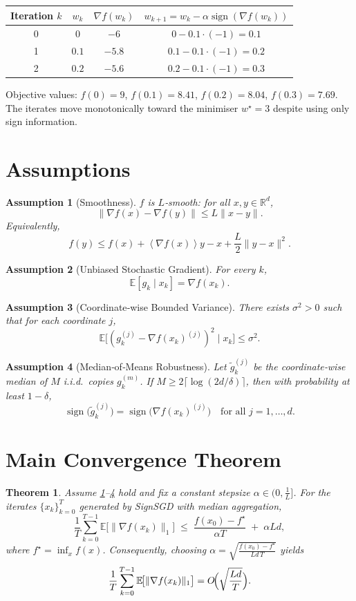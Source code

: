 \documentclass{article}
\newtheorem{theorem}{Theorem}
\newtheorem{assumption}{Assumption}
\newcommand{\E}{\mathbb{E}}
\newcommand{\R}{\mathbb{R}}
\newcommand{\sign}{\operatorname{sign}}
\newcommand{\inner}[1]{\left\langle#1\right\rangle}
\begin{document}
\begin{center}
\begin{tabular}{c|c|c|c}
Iteration $k$ & $w_k$ & $\nabla f(w_k)$ & $w_{k+1}=w_k-\alpha\sign(\nabla f(w_k))$\\ \hline
0 & $0$ & $-6$ & $0-0.1\cdot(-1)=0.1$\\
1 & $0.1$ & $-5.8$ & $0.1-0.1\cdot(-1)=0.2$\\
2 & $0.2$ & $-5.6$ & $0.2-0.1\cdot(-1)=0.3$\\
\end{tabular}
\end{center}
Objective values: $f(0)=9$, $f(0.1)=8.41$, $f(0.2)=8.04$, $f(0.3)=7.69$.  The iterates move monotonically toward the minimiser $w^\star=3$ despite using only sign information.

\newpage
\section*{Assumptions}
\begin{assumption}[Smoothness]\label{ass:smooth}
$f$ is $L$‑smooth: for all $x,y\in\R^{d}$,
\[
\|\nabla f(x)-\nabla f(y)\|\le L\|x-y\|.
\]
Equivalently,
\[
f(y)\le f(x)+\inner{\nabla f(x)}{y-x}+\frac{L}{2}\|y-x\|^{2}.
\]
\end{assumption}

\begin{assumption}[Unbiased Stochastic Gradient]\label{ass:unbiased}
For every $k$,
\[
\E[g_k\mid x_k]=\nabla f(x_k).
\]
\end{assumption}

\begin{assumption}[Coordinate‑wise Bounded Variance]\label{ass:var}
There exists $ \sigma^{2}>0 $ such that for each coordinate $j$,
\[
\E\!\bigl[(g_k^{(j)}-\nabla f(x_k)^{(j)})^{2}\mid x_k\bigr]\le\sigma^{2}.
\]
\end{assumption}

\begin{assumption}[Median‑of‑Means Robustness]\label{ass:median}
Let $\tilde{g}_k^{(j)}$ be the coordinate‑wise median of $M$ i.i.d.\ copies $g_k^{(m)}$.  
If $M\ge 2\lceil\log(2d/\delta)\rceil$, then with probability at least $1-\delta$,
\[
\sign\!\bigl(\tilde{g}_k^{(j)}\bigr)=\sign\!\bigl(\nabla f(x_k)^{(j)}\bigr)
\quad\text{for all }j=1,\dots,d.
\]
\end{assumption}

\section*{Main Convergence Theorem}
\begin{theorem}\label{thm:main}
Assume \ref{ass:smooth}–\ref{ass:median} hold and fix a constant stepsize
$\alpha\in\bigl(0,\frac{1}{L}\bigr]$.  For the iterates $\{x_k\}_{k=0}^{T}$ generated by SignSGD with median aggregation,
\[
\frac{1}{T}\sum_{k=0}^{T-1}\E\!\bigl[\|\nabla f(x_k)\|_{1}\bigr]
\;\le\;
\frac{f(x_0)-f^{\star}}{\alpha T}
\;+\;
\alpha L d,
\]
where $f^{\star}= \inf_{x}f(x)$.
Consequently, choosing $\alpha=\sqrt{\frac{f(x_0)-f^{\star}}{L d\,T}}$ yields
\[
\frac{1}{T}\sum_{k=0}^{T-1}\E\!\bigl[\|\nabla f(x_k)\|_{1}\bigr]
=O\!\Bigl(\sqrt{\frac{L d}{T}}\Bigr).
\]
\end{theorem}
\end{document}
